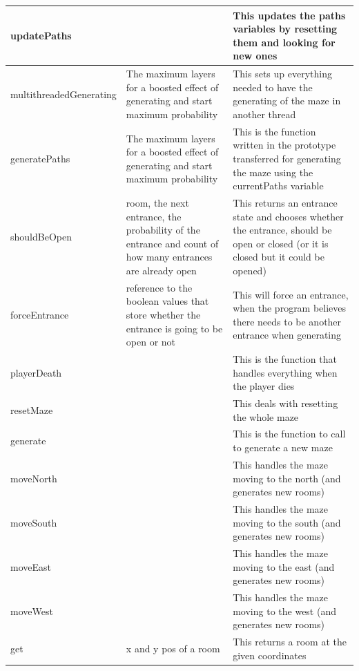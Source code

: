 \documentclass[../../Main.tex]{subfiles}
\begin{document}
\begin{center}
\begin{tabular}{ | m{} | m{}| m{} | }
            \hline
            updatePaths & & This updates the paths variables by resetting them and looking for new ones \\
            \hline
            multithreadedGenerating & The maximum layers for a boosted effect of generating and start maximum probability & This sets up everything needed to have the generating of the maze in another thread \\
            \hline
            generatePaths &  The maximum layers for a boosted effect of generating and start maximum probability & This is the function written in the prototype transferred for generating the maze using the currentPaths variable \\
            \hline
            shouldBeOpen & room, the next entrance, the probability of the entrance and count of how many entrances are already open & This returns an entrance state and chooses whether the entrance, should be open or closed (or it is closed but it could be opened)\\
            \hline
            forceEntrance & reference to the boolean values that store whether the entrance is going to be open or not & This will force an entrance, when the program believes there needs to be another entrance when generating \\
            \hline
            playerDeath & & This is the function that handles everything when the player dies \\
            \hline
            resetMaze & & This deals with resetting the whole maze \\
            \hline
            generate & & This is the function to call to generate a new maze \\
            \hline
            moveNorth & & This handles the maze moving to the north (and generates new rooms)\\
            \hline
            moveSouth & & This handles the maze moving to the south (and generates new rooms)\\
            \hline
            moveEast & & This handles the maze moving to the east (and generates new rooms) \\
            \hline
            moveWest & & This handles the maze moving to the west (and generates new rooms)\\
            \hline
            get & x and y pos of a room & This returns a room at the given coordinates \\
            \hline
        \end{tabular}
    \end{center}
\end{document}

